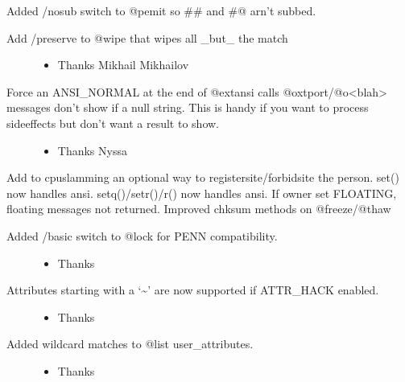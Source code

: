 \documentclass[letterpaper,10pt,english]{sphinxmanual}
\begin{document}
\sphinxAtStartPar
Added /nosub switch to @pemit so \#\# and \#@ arn’t subbed.
\begin{description}
\item[{Add /preserve to @wipe that wipes all \_but\_ the match}] \leavevmode\begin{itemize}
\item {} 
\sphinxAtStartPar
Thanks Mikhail Mikhailov

\end{itemize}

\item[{Force an ANSI\_NORMAL at the end of @extansi calls @oxtport/@o\textless{}blah\textgreater{} messages don’t show if a null string.  This is handy if you want to process sideeffects but don’t want a result to show.}] \leavevmode\begin{itemize}
\item {} 
\sphinxAtStartPar
Thanks Nyssa

\end{itemize}

\end{description}

\sphinxAtStartPar
Add to cpu\sphinxhyphen{}slamming an optional way to register\sphinxhyphen{}site/forbid\sphinxhyphen{}site the person.
set() now handles ansi.
setq()/setr()/r() now handles ansi.
If owner set FLOATING, floating messages not returned.
Improved chksum methods on @freeze/@thaw
\begin{description}
\item[{Added /basic switch to @lock for PENN compatibility.}] \leavevmode\begin{itemize}
\item {} 
\sphinxAtStartPar
Thanks 

\end{itemize}

\item[{Attributes starting with a ‘\textasciitilde{}’ are now supported if ATTR\_HACK enabled.}] \leavevmode\begin{itemize}
\item {} 
\sphinxAtStartPar
Thanks 

\end{itemize}

\item[{Added wildcard matches to @list user\_attributes.}] \leavevmode\begin{itemize}
\item {} 
\sphinxAtStartPar
Thanks 

\end{itemize}

\end{description}
\end{document}
